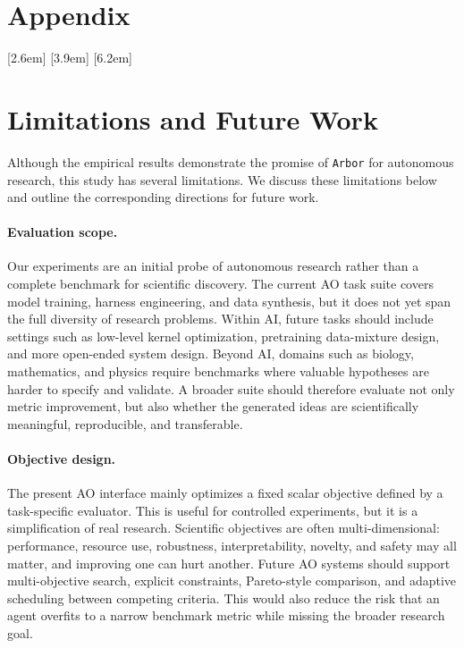 \documentclass{llmxive}
\providecommand{\arbor}{\texttt{Arbor}}
\providecommand{\setupappendixtoc}{    \titlecontents{section}
        [2.6em]
        {\addvspace{0.35em}\small\bfseries}
        {\contentslabel{2.3em}}
        {}
        {\titlerule*[0.45pc]{.}\contentspage}
    \titlecontents{subsection}
        [3.9em]
        {\small}
        {\contentslabel{2.8em}}
        {}
        {\titlerule*[0.45pc]{.}\contentspage}
    \titlecontents{subsubsection}
        [6.2em]
        {\footnotesize}
        {\contentslabel{3.5em}}
        {}
        {\titlerule*[0.45pc]{.}\contentspage}}
\providecommand{\ours}{\arbor}
\begin{document}
\appendix


\section*{Appendix}
\label{app:contents}
\providecommand{\ours}{\arbor}
\startcontents[sections]
\setupappendixtoc
{\hypersetup{linkcolor=AppendixTOCSection}
}

\section{Limitations and Future Work}
\label{app:limitations-future}

Although the empirical results demonstrate the promise of \arbor{} for
autonomous research, this study has several limitations. We discuss these
limitations below and outline the corresponding directions for future work.

\paragraph{Evaluation scope.}
Our experiments are an initial probe of autonomous research rather than a
complete benchmark for scientific discovery. The current AO task suite covers
model training, harness engineering, and data synthesis, but it does not yet
span the full diversity of research problems. Within AI, future tasks should
include settings such as low-level kernel optimization, pretraining data-mixture
design, and more open-ended system design. Beyond AI, domains such as biology,
mathematics, and physics require benchmarks where valuable hypotheses are harder
to specify and validate. A broader suite should therefore evaluate not only
metric improvement, but also whether the generated ideas are scientifically
meaningful, reproducible, and transferable.

\paragraph{Objective design.}
The present AO interface mainly optimizes a fixed scalar objective defined by a
task-specific evaluator. This is useful for controlled experiments, but it is a
simplification of real research. Scientific objectives are often multi-dimensional:
performance, resource use, robustness, interpretability, novelty, and safety may
all matter, and improving one can hurt another. Future AO systems should support
multi-objective search, explicit constraints, Pareto-style comparison, and
adaptive scheduling between competing criteria. This would also reduce the risk
that an agent overfits to a narrow benchmark metric while missing the broader
research goal.
\end{document}
